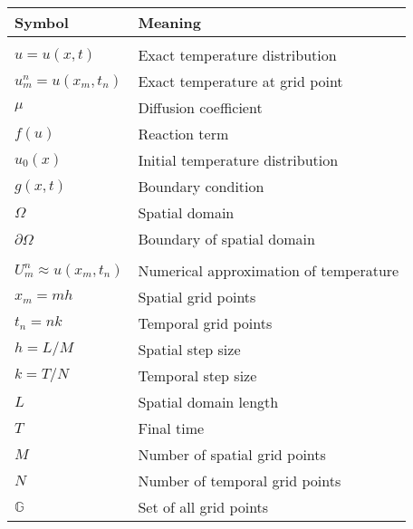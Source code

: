 \begin{tabular}{ll}
  \textbf{Symbol}               & \textbf{Meaning}                       \\
  \hline                                                                 \\[-1em]
  \(u = u(x, t)\)               & Exact temperature distribution         \\
  \(u_m^n = u(x_m, t_n)\)       & Exact temperature at grid point        \\
  \(\mu\)                       & Diffusion coefficient                  \\
  \(f(u)\)                      & Reaction term                          \\
  \(u_0(x)\)                    & Initial temperature distribution       \\
  \(g(x, t)\)                   & Boundary condition                     \\
  \(\Omega\)                    & Spatial domain                         \\
  \(\partial \Omega\)           & Boundary of spatial domain             \\
  \hline                                                                 \\[-1em]
  \(U_m^n \approx u(x_m, t_n)\) & Numerical approximation of temperature \\
  \(x_m = m h\)                 & Spatial grid points                    \\
  \(t_n = n k\)                 & Temporal grid points                   \\
  \(h = L/M\)                   & Spatial step size                      \\
  \(k =T/N\)                    & Temporal step size                     \\
  \(L\)                         & Spatial domain length                  \\
  \(T\)                         & Final time                             \\
  \(M\)                         & Number of spatial grid points          \\
  \(N\)                         & Number of temporal grid points         \\
  \(\mathbb{G}\)                & Set of all grid points                 \\
  \hline
\end{tabular}


